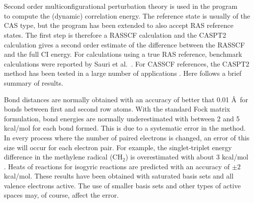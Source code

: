 
\section{}
\label{UG:sec:caspt2}

Second order multiconfigurational perturbation theory is used in the program
~\cite{Andersson:90,Andersson:92a} to compute the (dynamic)
correlation  energy. The reference state is
usually of the CAS type, but the program has been extended to also accept
RAS reference states\cite{Malmqvist:2008,Sauri:2011}.
The first step is therefore a RASSCF calculation and the CASPT2
calculation gives a second order estimate of the difference between the RASSCF
and the full CI energy. For calculations using a true RAS reference, benchmark
calculations were reported by Sauri et al.~\cite{Sauri:2011}. For CASSCF
references, the CASPT2 method has been tested in a large number
of applications \cite{Roos:95a,Roos:96b}.  Here follows a brief summary of
results.

Bond distances are normally obtained with an accuracy of better that 0.01
\AA\ for bonds between first and second row atoms. With the standard Fock
matrix formulation, bond energies are normally underestimated with between 2
and 5 kcal/mol for each bond formed. This is due to a systematic error in the
method\cite{Andersson:93a}. In every process where the number of paired
electrons is changed, an error of this size will occur for each electron pair.
For example, the singlet-triplet energy difference in the methylene radical
(CH$_2$) is overestimated with about 3 kcal/mol \cite{Andersson:92a}. Heats of
reactions for isogyric reactions are predicted with an accuracy of $\pm2$
kcal/mol. These results have been obtained with saturated basis sets and all
valence electrons active. The use of smaller basis sets and other types of
active spaces may, of course, affect the error.

